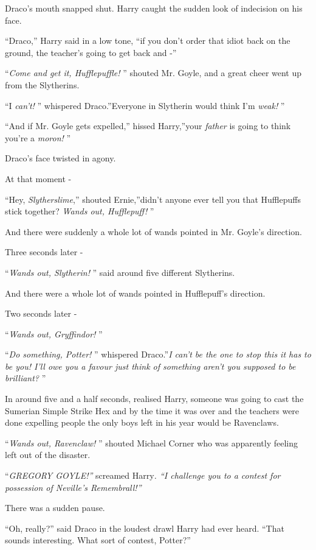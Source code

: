 Draco's mouth snapped shut. Harry caught the sudden look of indecision
on his face.

``Draco,'' Harry said in a low tone, ``if you don't order that idiot
back on the ground, the teacher's going to get back and -''

``\emph{Come and get it, Hufflepuffle!} '' shouted Mr. Goyle, and a great
cheer went up from the Slytherins.

``I \emph{can't!} '' whispered Draco.''Everyone in Slytherin would think
I'm \emph{weak!} ''

``And if Mr. Goyle gets expelled,'' hissed Harry,''your \emph{father} is
going to think you're a \emph{moron!} ''

Draco's face twisted in agony.

At that moment -

``Hey, \emph{Slytherslime},'' shouted Ernie,''didn't anyone ever tell you
that Hufflepuffs stick together? \emph{Wands out, Hufflepuff!} ''

And there were suddenly a whole lot of wands pointed in Mr. Goyle's
direction.

Three seconds later -

``\emph{Wands out, Slytherin!} '' said around five different Slytherins.

And there were a whole lot of wands pointed in Hufflepuff's direction.

Two seconds later -

``\emph{Wands out, Gryffindor!} ''

``\emph{Do something, Potter!} '' whispered Draco.''\emph{I can't be the
one to stop this it has to be you! I'll owe you a favour just think of
something aren't you supposed to be brilliant?} ''

In around five and a half seconds, realised Harry, someone was going to
cast the Sumerian Simple Strike Hex and by the time it was over and the
teachers were done expelling people the only boys left in his year would
be Ravenclaws.

``\emph{Wands out, Ravenclaw!} '' shouted Michael Corner who was
apparently feeling left out of the disaster.

``\emph{GREGORY GOYLE!''} screamed Harry\emph{. ``I challenge you to a
contest for possession of Neville's Remembrall!''}

There was a sudden pause.

``Oh, really?'' said Draco in the loudest drawl Harry had ever heard.
``That sounds interesting. What sort of contest, Potter?''

